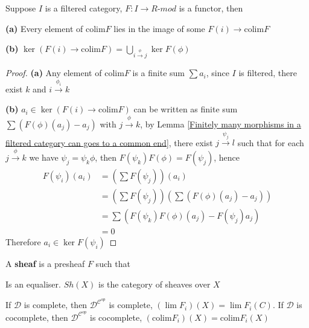 \documentclass[../main.tex]{subfiles}
\begin{document}
\begin{lemma}
Suppose $I$ is a filtered category, $F:I\to R$-$mod$ is a functor, then \par
\textbf{(a) }Every element of $\mathrm{colim}F$ lies in the image of some $F(i)\to\mathrm{colim}F$ \par
\textbf{(b) }$\displaystyle\ker(F(i)\to\mathrm{colim}F)=\bigcup_{i\xrightarrow{\phi}j}\ker F(\phi)$
\end{lemma}

\begin{proof}
\textbf{(a) }Any element of $\mathrm{colim}F$ is a finite sum $\sum a_i$, since $I$ is filtered, there exist $k$ and $i\xrightarrow{\phi_i}k$ \par
\textbf{(b) }$a_i\in\ker(F(i)\to\mathrm{colim}F)$ can be written as finite sum $\sum(F(\phi)(a_j)-a_j)$ with $j\xrightarrow{\phi}k$, by Lemma \ref{Finitely many morphisms in a filtered category can goes to a common end}, there exist $j\xrightarrow{\psi_j}l$ such that for each $j\xrightarrow{\phi}k$ we have $\psi_j=\psi_k\phi$, then $F(\psi_k)F(\phi)=F(\psi_j)$, hence
\begin{align*}
F(\psi_i)(a_i)&=\left(\sum F(\psi_j)\right)(a_i) \\
&=\left(\sum F(\psi_j)\right)\left(\sum(F(\phi)(a_j)-a_j)\right) \\
&=\sum\left(F(\psi_k)F(\phi)(a_j)-F(\psi_j)a_j\right) \\
&=0
\end{align*}
Therefore $a_i\in\ker F(\psi_i)$
\end{proof}

\begin{definition}
A \textbf{sheaf} is a presheaf $F$ such that
\begin{center}
\end{center}
Is an equaliser. $Sh(X)$ is the category of sheaves over $X$
\end{definition}

\begin{proposition}
If $\mathscr D$ is complete, then $\mathscr D^{\mathscr C^{op}}$ is complete, $(\lim F_i)(X)=\lim F_i(C)$. If $\mathscr D$ is cocomplete, then $\mathscr D^{\mathscr C^{op}}$ is cocomplete, $(\mathrm{colim} F_i)(X)=\mathrm{colim} F_i(X)$
\end{proposition}
\end{document}
